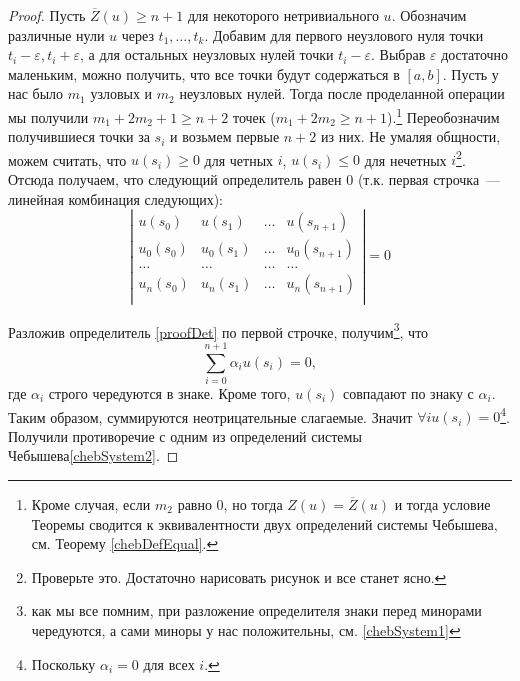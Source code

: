  \begin{proof}
Пусть $\overline{Z}(u) \geq n+1$ для некоторого нетривиального $u$. Обозначим различные нули $u$ через $t_1, …, t_k$. 
Добавим для первого неузлового нуля точки $t_i-\varepsilon, t_i+\varepsilon$, а для остальных неузловых нулей точки $t_i - \varepsilon$. Выбрав $\varepsilon$ достаточно маленьким, можно получить, что все точки будут содержаться в $[a,b]$. Пусть у нас было $m_1$ узловых и $m_2$ неузловых нулей. Тогда после проделанной операции мы получили $m_1 + 2m_2 + 1 \geq n+2$ точек ($m_1+2m_2 \geq n+1$).\footnote{Кроме случая, если $m_2$ равно $0$, но тогда
$Z(u) = \overline Z(u)$ и тогда условие Теоремы сводится к эквивалентности двух определений системы Чебышева, см. Теорему \ref{chebDefEqual}.}
Переобозначим получившиеся точки за $s_i$ и возьмем первые $n+2$ из них. Не умаляя общности, можем считать, что $u(s_{i}) \geq 0$ для четных $i$, $u(s_{i}) \leq 0$ для нечетных $i$\footnote{Проверьте это. Достаточно нарисовать рисунок и все станет ясно.}. Отсюда получаем, что следующий определитель равен 0 (т.к. первая строчка — линейная комбинация следующих):
\begin{equation}
\label{proofDet}
\left| \begin{array}{cccc}
u(s_0) & u(s_1) & … & u(s_{n+1}) \\
u_0(s_0) & u_0(s_1) & … & u_0(s_{n+1})\\
… & … & … & …\\
u_n(s_0) & u_n(s_1) & … & u_n(s_{n+1})\\ 
\end{array}
\right| = 0
\end{equation}

Разложив определитель \eqref{proofDet} по первой строчке, получим\footnote{как мы все помним, при разложение определителя знаки перед минорами чередуются, а сами миноры у нас положительны, см. \ref{chebSystem1}}, что 
$$\sum\limits_{i=0}^{n+1} \alpha_iu(s_i) = 0,$$
где $\alpha_i$ строго чередуются в знаке. Кроме того, $u(s_i)$ совпадают по знаку с $\alpha_i$. Таким образом, суммируются неотрицательные слагаемые. Значит $\forall i u(s_i) = 0$\footnote{Поскольку $\alpha_i = 0$ для всех $i$.}.
    Получили противоречие с одним из определений системы Чебышева\eqref{chebSystem2}.
 \end{proof}

